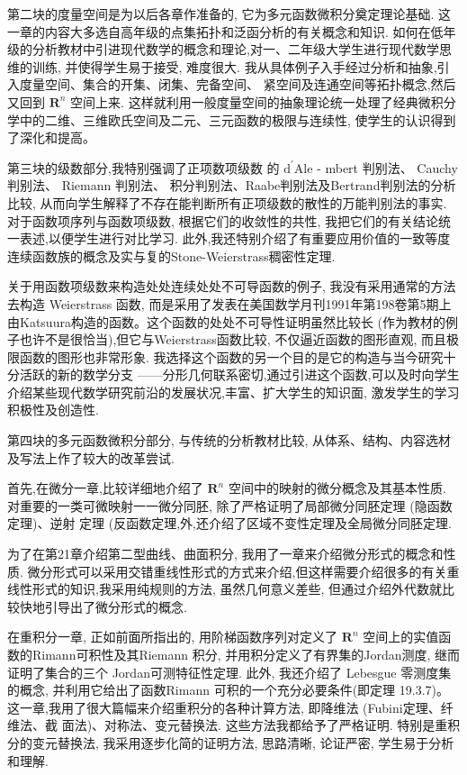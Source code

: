 第二块的度量空间是为以后各章作准备的, 它为多元函数微积分奠定理论基础. 这一章的内容大多选自高年级的点集拓扑和泛函分析的有关概念和知识. 如何在低年级的分析教材中引进现代数学的概念和理论,对一、二年级大学生进行现代数学思维的训练, 并使得学生易于接受, 难度很大. 我从具体例子入手经过分析和抽象,引入度量空间、集合的开集、闭集、完备空间、 紧空间及连通空间等拓扑概念,然后又回到 \({\mathbf{R}}^{n}\) 空间上来. 这样就利用一般度量空间的抽象理论统一处理了经典微积分学中的二维、三维欧氏空间及二元、三元函数的极限与连续性, 使学生的认识得到了深化和提高。

第三块的级数部分,我特别强调了正项数项级数 的 \({\mathrm{d}}^{\prime }\mathrm{{Ale}}\) - mbert 判别法、 Cauchy 判别法、 Riemann 判别法、 积分判别法、Raabe判别法及Bertrand判别法的分析比较, 从而向学生解释了不存在能判断所有正项级数的散性的万能判别法的事实. 对于函数项序列与函数项级数, 根据它们的收敛性的共性, 我把它们的有关结论统一表述,以便学生进行对比学习. 此外,我还特别介绍了有重要应用价值的一致等度连续函数族的概念及实与复的Stone-Weierstrass稠密性定理.

关于用函数项级数来构造处处连续处处不可导函数的例子, 我没有采用通常的方法去构造 Weierstrass 函数, 而是采用了发表在美国数学月刊1991年第198卷第5期上由Katsuura构造的函数。这个函数的处处不可导性证明虽然比较长 (作为教材的例子也许不是很恰当),但它与Weierstrass函数比较, 不仅逼近函数的图形直观, 而且极限函数的图形也非常形象. 我选择这个函数的另一个目的是它的构造与当今研究十分活跃的新的数学分支 ——分形几何联系密切,通过引进这个函数,可以及时向学生介绍某些现代数学研究前沿的发展状况,丰富、扩大学生的知识面, 激发学生的学习积极性及创造性.

第四块的多元函数微积分部分, 与传统的分析教材比较, 从体系、结构、内容选材及写法上作了较大的改革尝试.

首先,在微分一章,比较详细地介绍了 \({\mathbf{R}}^{n}\) 空间中的映射的微分概念及其基本性质. 对重要的一类可微映射一一微分同胚, 除了严格证明了局部微分同胚定理 (隐函数定理)、逆射 定理 (反函数定理,外,还介绍了区域不变性定理及全局微分同胚定理.

为了在第21章介绍第二型曲线、曲面积分, 我用了一章来介绍微分形式的概念和性质. 微分形式可以采用交错重线性形式的方式来介绍,但这样需要介绍很多的有关重线性形式的知识,我采用纯规则的方法, 虽然几何意义差些, 但通过介绍外代数就比较快地引导出了微分形式的概念.

在重积分一章, 正如前面所指出的, 用阶梯函数序列对定义了 \({\mathbf{R}}^{n}\) 空间上的实值函数的Rimann可积性及其Riemann 积分, 并用积分定义了有界集的Jordan测度, 继而证明了集合的三个 Jordan可测特征性定理. 此外, 我还介绍了 Lebesgue 零测度集的概念, 并利用它给出了函数Rimann 可积的一个充分必要条件(即定理 19.3.7)。这一章,我用了很大篇幅来介绍重积分的各种计算方法, 即降维法 (Fubini定理、纤维法、截 面法)、对称法、变元替换法. 这些方法我都给予了严格证明. 特别是重积分的变元替换法, 我采用逐步化简的证明方法, 思路清晰, 论证严密, 学生易于分析和理解.

